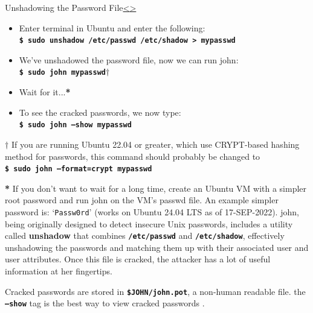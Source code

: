 \documentclass[12pt]{extarticle}
\newcommand{\code}[1]{\texttt{\bfseries#1}}
\newenvironment{instructionblock}{\Large\bgroup}{\egroup}
\begin{document}
	\pagebreak
	\begin{slide}{Unshadowing the Password File}{\hyperref[slide 8]{\textless}\hyperref[slide 10]{\textgreater}}
		\begin{instructionblock}
			\begin{itemize}
				\item Enter terminal in Ubuntu and enter the following:\\
				\code{\$ sudo unshadow /etc/passwd /etc/shadow > mypasswd} 	
				\item We've unshadowed the password file, now we can run john:\\
				\code{\$ sudo john mypasswd{\textbf{$\dagger$}}}
				\item{Wait for it...\textbf{*}}
				\item{To see the cracked passwords, we now type:}\\
				\code{\$ sudo john --show mypasswd}
			\end{itemize}
		\end{instructionblock}
	\end{slide}
	\textbf{$\dagger$} If you are running Ubuntu 22.04 or greater, which use CRYPT-based hashing method for passwords, this command should probably be changed to\\ 
	{\code{\$ sudo john --format=crypt mypasswd}}
	
	\textbf{*} If you don't want to wait for a long time, create an Ubuntu VM with a simpler root password and run john on the VM's passwd file. An example simpler password is: `\texttt{Passw0rd}' (works on Ubuntu 24.04 LTS as of 17-SEP-2022).
	\vfill
	john, being originally designed to detect insecure Unix passwords, includes a utility called \textbf{unshadow} that combines \code{/etc/passwd} and \code{/etc/shadow}, effectively unshadowing the passwords and matching them up with their associated user and user attributes. Once this file is cracked, the attacker has a lot of useful information at her fingertips. \cite{john}
	
	Cracked passwords are stored in \code{\$JOHN/john.pot}, a non-human readable file. the \code{--show} tag is the best way to view cracked passwords \cite{john}.
	
\end{document}
